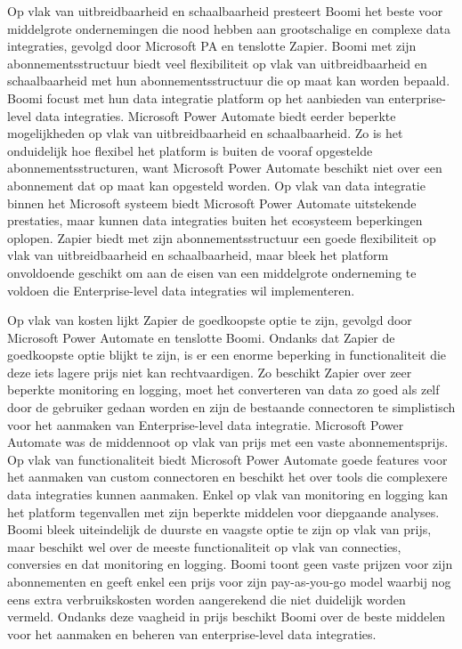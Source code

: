 Op vlak van uitbreidbaarheid en schaalbaarheid presteert Boomi het beste voor middelgrote ondernemingen die nood hebben aan grootschalige en complexe data integraties, gevolgd door Microsoft PA en tenslotte Zapier. Boomi met zijn abonnementsstructuur biedt veel flexibiliteit op vlak van uitbreidbaarheid en schaalbaarheid met hun abonnementsstructuur die op maat kan worden bepaald. Boomi focust met hun data integratie platform op het aanbieden van enterprise-level data integraties. Microsoft Power Automate biedt eerder beperkte mogelijkheden op vlak van uitbreidbaarheid en schaalbaarheid. Zo is het onduidelijk hoe flexibel het platform is buiten de vooraf opgestelde abonnementsstructuren, want Microsoft Power Automate beschikt niet over een abonnement dat op maat kan opgesteld worden. Op vlak van data integratie binnen het Microsoft systeem biedt Microsoft Power Automate uitstekende prestaties, maar kunnen data integraties buiten het ecosysteem beperkingen oplopen. Zapier biedt met zijn abonnementsstructuur een goede flexibiliteit op vlak van uitbreidbaarheid en schaalbaarheid, maar bleek het platform onvoldoende geschikt om aan de eisen van een middelgrote onderneming te voldoen die Enterprise-level data integraties wil implementeren. 

\vspace{\baselineskip}

Op vlak van kosten lijkt Zapier de goedkoopste optie te zijn, gevolgd door Microsoft Power Automate en tenslotte Boomi. Ondanks dat Zapier de goedkoopste optie blijkt te zijn, is er een enorme beperking in functionaliteit die deze iets lagere prijs niet kan rechtvaardigen. Zo beschikt Zapier over zeer beperkte monitoring en logging, moet het converteren van data zo goed als zelf door de gebruiker gedaan worden en zijn de bestaande connectoren te simplistisch voor het aanmaken van Enterprise-level data integratie. Microsoft Power Automate was de middennoot op vlak van prijs met een vaste abonnementsprijs. Op vlak van functionaliteit biedt Microsoft Power Automate goede features voor het aanmaken van custom connectoren en beschikt het over tools die complexere data integraties kunnen aanmaken. Enkel op vlak van monitoring en logging kan het platform tegenvallen met zijn beperkte middelen voor diepgaande analyses. Boomi bleek uiteindelijk de duurste en vaagste optie te zijn op vlak van prijs, maar beschikt wel over de meeste functionaliteit op vlak van connecties, conversies en dat monitoring en logging. Boomi toont geen vaste prijzen voor zijn abonnementen en geeft enkel een prijs voor zijn pay-as-you-go model waarbij nog eens extra verbruikskosten worden aangerekend die niet duidelijk worden vermeld. Ondanks deze vaagheid in prijs beschikt Boomi over de beste middelen voor het aanmaken en beheren van enterprise-level data integraties.

